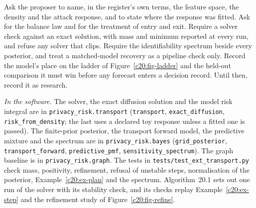 \begin{inpractice}
Ask the proposer to name, in the register's own terms, the feature space, the density and
the attack response, and to state where the response was fitted. Ask for the balance law and
for the treatment of entry and exit. Require a solver check against an exact solution, with mass
and minimum reported at every run, and refuse any solver that clips. Require the identifiability
spectrum beside every posterior, and treat a matched-model recovery as a pipeline check only.
Record the model's place on the ladder of Figure~\ref{c20:fig-ladder} and the held-out comparison it must win
before any forecast enters a decision record. Until then, record it as research.

\medskip\noindent\textit{In the software.} The solver, the exact diffusion solution and the model risk integral are in
\texttt{privacy\_risk.transport} (\texttt{transport}, \texttt{exact\_diffusion}, \texttt{risk\_from\_density}; the last uses
a declared toy response unless a fitted one is passed). The finite-prior posterior, the
transport forward model, the predictive mixture and the spectrum are in \texttt{privacy\_risk.bayes} (\texttt{grid\_posterior},
\texttt{transport\_forward}, \texttt{predictive\_pmf}, \texttt{sensitivity\_spectrum}). The graph baseline is in \texttt{privacy\_risk.graph}.
The tests in \texttt{tests/test\_ext\_transport.py} check mass, positivity, refinement, refusal of unstable steps, normalisation of the posterior, Example~\ref{c20:ex-plan} and the spectrum. Algorithm~20.1 sets out one run of the solver with its stability check, and its checks replay Example~\ref{c20:ex-step} and the refinement study of Figure~\ref{c20:fig-refine}.
\end{inpractice}


